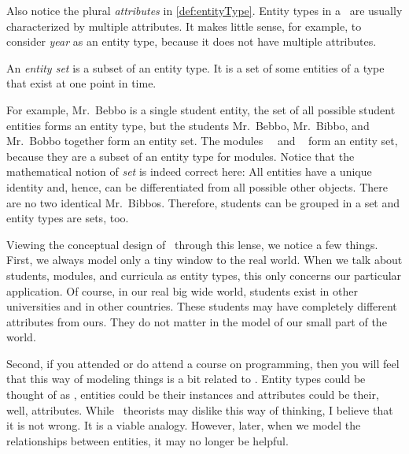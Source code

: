Also notice the plural \emph{attributes} in \cref{def:entityType}.
Entity types in a \db\ are usually characterized by multiple attributes.
It makes little sense, for example, to consider \emph{year} as an entity type, because it does not have multiple attributes.%
%
\begin{definition}%
An \emph{entity set} is a subset of an entity type. %
It is a set of some entities of a type that exist at one point in time.%
\end{definition}%
%
For example, Mr.~Bebbo is a single student entity, the set of all possible student entities forms an entity type, but the students Mr.~Bebbo, Mr.~Bibbo, and Mr.~Bobbo together form an entity set.
The modules~~\cite{programmingWithPython} and ~\cite{databases} form an entity set, because they are a subset of an entity type for modules.
Notice that the mathematical notion of \emph{set} is indeed correct here:
All entities have a unique identity and, hence, can be differentiated from all possible other objects.
There are no two identical Mr.~Bibbos.
Therefore, students can be grouped in a set and entity types are sets, too.

Viewing the conceptual design of \dbs\ through this lense, we notice a few things.
First, we always model only a tiny window to the real world.
When we talk about students, modules, and curricula as entity types, this only concerns our particular application.
Of course, in our real big wide world, students exist in other universities and in other countries.
These students may have completely different attributes from ours.
They do not matter in the model of our small part of the world.

Second, if you attended or do attend a course on programming, then you will feel that this way of modeling things is a bit related to .
Entity types could be thought of as , entities could be their instances and attributes could be their, well, attributes.
While \db\ theorists may dislike this way of thinking, I believe that it is not wrong.
It is a viable analogy.
However, later, when we model the relationships between entities, it may no longer be helpful.%
\endhsection%
%
